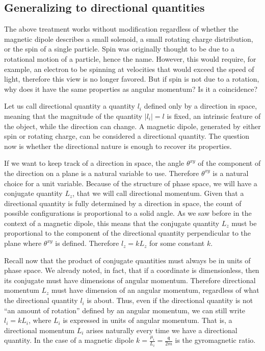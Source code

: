 \subsection{Generalizing to directional quantities}

The above treatment works without modification regardless of whether the magnetic dipole describes a small solenoid, a small rotating charge distribution, or the spin of a single particle. Spin was originally thought to be due to a rotational motion of a particle, hence the name. However, this would require, for example, an electron to be spinning at velocities that would exceed the speed of light, therefore this view is no longer favored. But if spin is not due to a rotation, why does it have the same properties as angular momentum? Is it a coincidence?

Let us call directional quantity a quantity $l_i$ defined only by a direction in space, meaning that the magnitude of the quantity $|l_i|=l$ is fixed, an intrinsic feature of the object, while the direction can change. A magnetic dipole, generated by either spin or rotating charge, can be considered a directional quantity. The question now is whether the directional nature is enough to recover its properties.

If we want to keep track of a direction in space, the angle $\theta^{xy}$ of the component of the direction on a plane is a natural variable to use. Therefore $\theta^{xy}$ is a natural choice for a unit variable. Because of the structure of phase space, we will have a conjugate quantity $L_{z}$, that we will call directional momentum.  Given that a directional quantity is fully determined by a direction in space, the count of possible configurations is proportional to a solid angle. As we saw before in the context of a magnetic dipole, this means that the conjugate quantity $L_{z}$ must be proportional to the component of the directional quantity perpendicular to the plane where $\theta^{xy}$ is defined. Therefore $l_{z} = k L_{z}$ for some constant $k$.

Recall now that the product of conjugate quantities must always be in units of phase space. We already noted, in fact, that if a coordinate is dimensionless, then its conjugate must have dimensions of angular momentum. Therefore directional momentum $L_{z}$ must have dimension of an angular momentum, regardless of what the directional quantity $l_i$ is about. Thus, even if the directional quantity is not ``an amount of rotation'' defined by an angular momentum, we can still write $l_i = k L_i$, where $L_i$ is expressed in units of angular momentum. That is, a directional momentum $L_i$ arises naturally every time we have a directional quantity. In the case of a magnetic dipole $k = \frac{\mu_i}{L_i} = \frac{\mathfrak{q}}{2m}$ is the gyromagnetic ratio.

